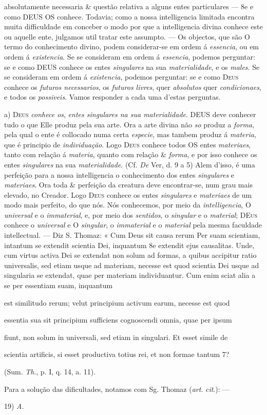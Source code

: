 absolutamente necessaria \& questão relativa a alguns entes particulares --- 8e e como \textsc{DEUS} OS conhece. Todavia; como a nossa intelligencia limitada encontra muita difficuldade em conceber o modo por que a intelligencia divina conhece este ou aquelle ente, julgamos util tratar este assumpto. --- Os objectos, que são O termo do conhecimento divino, podem considerar-se em ordem á \emph{essencia}, ou em ordem á \emph{existencia}. Se se consideram em ordem á \emph{essencia}, podemos perguntar: se e como \textsc{DEUS} conhece os entes \emph{singulares} na sua \emph{materialidade}, e os \emph{males}. Se se consideram em ordem á \emph{existencia}, podemos perguntar: se e como \textsc{Deus} conhece os \emph{futuros necessarios}, os \emph{futuros livres}, quer \emph{absolutos} quer \emph{condicionaes}, e todos os \emph{possiveis}. Vamos responder a cada uma d'estas perguntas.\par a) \textsc{Deus} \emph{conhece os}, \emph{entes singulares na sua materialidade}. \textsc{DEUS} deve conhecer tudo o que Elle produz pela sua arte. Ora a arte divina não \emph{so} produz a \emph{forma}, pela qual o ente é collocado numa certa \emph{especie}, mas tambem produz á \emph{materia}, que é principio de \emph{individuação}. Logo \textsc{Deus} conhece todos OS entes \emph{materiaes}, tanto com relação á \emph{materia}, quanto com relação \& \emph{forma}, e por isso conhece os entes \emph{singulares} na sua \emph{materialidade}. (Cf. \emph{De} Ver, d. 9 a 5) Alem d'isso, é uma perfeição para a nossa intelligencia o conhecimento dos entes \emph{singulares} e \emph{materiaes}. Ora toda \& perfeição da creatura deve encontrar-se, num grau mais elevado, no Creador. Logo \textsc{Deus} conhece os entes \emph{singulares} e \emph{materiaes} de um modo mais perfeito, do que nós. Nós conhecemos, por meio da \emph{intelligencia}, O \emph{universal} e o \emph{immaterial}, e, por meio dos \emph{sentidos}, o \emph{singular} e o \emph{material}; \textsc{DEus} conhece o \emph{universal} e O \emph{singular}, o \emph{immaterial} e o \emph{material} pela mesma faculdade intellectual. --- Diz S. Thomaz: « Cum Deus sit causa rerum Per suam scientiam, intantum se extendit scientia Dei, inquantum 8e extendit ejus causalitas. Unde, cum virtus activa Dei se extendat non solum ad formas, a quibus accipitur ratio universalis, sed etiam usque ad materiam, necesse est quod scientia Dei usque ad singularia se extendat, quae per materiam individuantur. Cum enim sciat alia a se per essentiam suam, inquantum\par est similitudo rerum; velut principium activum earum, necesse est quod\par essentia sua sit principium sufficiens cognoscendi omnia, quae per ipsum\par fiunt, non solum in universali, sed etiam in singulari. Et esset simile de\par scientia artificis, si esset productiva totius rei, et non formae tantum 7?\par (Sum. \emph{Th}., p. I, q. 14, a. 11).\par Para a solução das dificultades, notamos com Sg. Thomaz (\emph{art}. \emph{cit}.): ---\par 19) \emph{A}. 